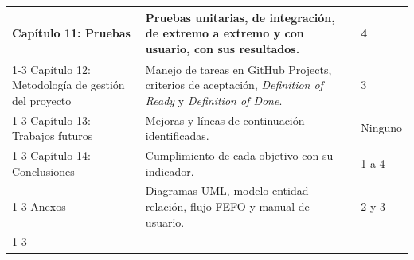 \begin{longtable}{|p{4.3cm}|p{8.7cm}|p{2.3cm}|}
Capítulo 11: Pruebas & Pruebas unitarias, de integración, de extremo a extremo y con usuario, con sus resultados. & 4\\ \cline{1-3}
Capítulo 12: Metodología de gestión del proyecto & Manejo de tareas en GitHub Projects, criterios de aceptación, \textit{Definition of Ready} y \textit{Definition of Done}. & 3\\ \cline{1-3}
Capítulo 13: Trabajos futuros & Mejoras y líneas de continuación identificadas. & Ninguno\\ \cline{1-3}
Capítulo 14: Conclusiones & Cumplimiento de cada objetivo con su indicador. & 1 a 4\\ \cline{1-3}
Anexos & Diagramas UML, modelo entidad relación, flujo FEFO y manual de usuario. & 2 y 3\\ \cline{1-3}
\end{longtable}
